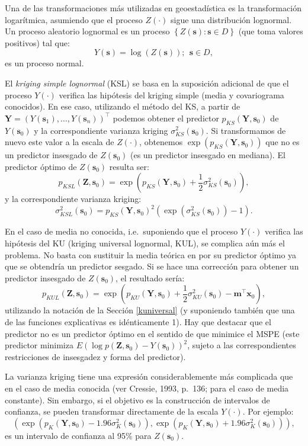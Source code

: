 \documentclass[
  spanish,
]{book}
\theoremstyle{break}
\theoremstyle{definition}
\theoremstyle{definition}
\theoremstyle{definition}
\theoremstyle{definition}
\theoremstyle{remark}
\begin{document}
Una de las transformaciones más utilizadas en geoestadística es la transformación logarítmica, asumiendo que el proceso \(Z(\cdot)\) sigue una distribución lognormal.
Un proceso aleatorio lognormal es un proceso \(\left\{ Z(\mathbf{s}):\mathbf{s}\in D\right\}\) (que toma valores positivos) tal que:
\[Y(\mathbf{s})=\log \left( Z(\mathbf{s})\right) ;\ \ \mathbf{s}\in D,\]
es un proceso normal.

El \emph{kriging simple lognormal} (KSL) se basa en la suposición adicional de que el proceso \(Y(\cdot)\) verifica las hipótesis del kriging simple (media y covariograma conocidos).
En ese caso, utilizando el método del KS, a partir de \(\mathbf{Y}=(Y(\mathbf{s}_{1}), \ldots,Y(\mathbf{s}_{n} ))^\top\) podemos obtener el predictor \(p_{KS} (\mathbf{Y},\mathbf{s}_{0})\) de \(Y(\mathbf{s}_{0})\) y la correspondiente varianza kriging \(\sigma_{KS}^{2} (\mathbf{s}_{0})\).
Si transformamos de nuevo este valor a la escala de \(Z(\cdot)\), obtenemos \(\exp (p_{KS} (\mathbf{Y},\mathbf{s}_{0}))\) que no es un predictor insesgado de \(Z(\mathbf{s}_{0})\) (es un predictor insesgado en mediana).
El predictor óptimo de \(Z(\mathbf{s}_{0})\) resulta ser:
\[p_{KSL} (\mathbf{Z},\mathbf{s}_{0}) = \exp \left( p_{KS}(\mathbf{Y},\mathbf{s}_{0}) + \frac{1}{2} \sigma_{KS}^{2}(\mathbf{s}_{0}) \right),\]
y la correspondiente varianza kriging:
\[\sigma_{KSL}^{2} (\mathbf{s}_{0})=p_{KS} (\mathbf{Y},\mathbf{s}_{0}
)^{2} \left( \exp (\sigma_{KS}^{2} (\mathbf{s}_{0}))-1\right).\]

En el caso de media no conocida, i.e.~suponiendo que el proceso \(Y(\cdot)\) verifica las hipótesis del KU (kriging universal lognormal, KUL), se complica aún más el problema.
No basta con sustituir la media teórica en por su predictor óptimo ya que se obtendría un predictor sesgado.
Si se hace una corrección para obtener un predictor insesgado de \(Z(\mathbf{s}_{0})\), el resultado sería:
\[p_{KUL} (\mathbf{Z},\mathbf{s}_{0}) = \exp \left( p_{KU}(\mathbf{Y},\mathbf{s}_{0}) + \frac{1}{2} \sigma_{KU}^{2}(\mathbf{s}_{0}) - \mathbf{m^\top }\mathbf{x}_0\right),\]
utilizando la notación de la Sección \ref{kuniversal} (y suponiendo también que una de las funciones explicativas es idénticamente 1).
Hay que destacar que el predictor no es un predictor óptimo en el sentido de que minimice el MSPE (este predictor minimiza \(E\left( \log p(\mathbf{Z},\mathbf{s}_{0})-Y(\mathbf{s}_{0})\right)^2\), sujeto a las correspondientes restricciones de insesgadez y forma del predictor).

La varianza kriging tiene una expresión considerablemente más complicada que en el caso de media conocida (ver Cressie, 1993, p.~136; para el caso de media constante).
Sin embargo, si el objetivo es la construcción de intervalos de confianza, se pueden transformar directamente de la escala \(Y(\cdot)\).
Por ejemplo:
\[\left( \exp \left( p_{K} (\mathbf{Y},\mathbf{s}_{0}) - 1.96\sigma_{K}^{2}(\mathbf{s}_{0}) \right), \exp \left( p_{K} (\mathbf{Y},\mathbf{s}_{0}) + 1.96\sigma_{K}^{2} (\mathbf{s}_{0})\right) \right),\]
es un intervalo de confianza al 95\% para \(Z(\mathbf{s}_{0})\).
\end{document}
